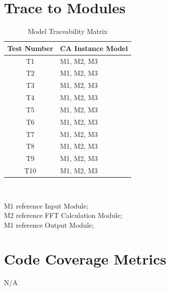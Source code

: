 \documentclass[12pt, titlepage]{article}
\begin{document}
\section{Trace to Modules}		
\begin{table} [H]
  \caption{Model Traceability Matrix}
  \label{Table:Table_Traceability_MG}  
\begin{tabular}{|c|p{8cm}|}
  \hline	
  \textbf{Test Number} & \textbf{CA Instance Model}\\
  \hline 
   T1& M1, M2, M3\\ \hline
   T2&  M1, M2, M3\\ \hline
   T3& M1, M2, M3\\ \hline
   T4& M1, M2, M3\\ \hline
   T5& M1, M2, M3\\ \hline
   T6& M1, M2, M3\\ \hline
   T7& M1, M2, M3\\ \hline
   T8&  M1, M2, M3\\ \hline
   T9& M1, M2, M3\\ \hline
   T10& M1, M2, M3\\ \hline

\end{tabular}\\
\end{table}
M1 reference Input Module;\\
M2 reference FFT Calculation Module;\\
M1 reference Output Module;\\

\section{Code Coverage Metrics}
N/A



\end{document}
